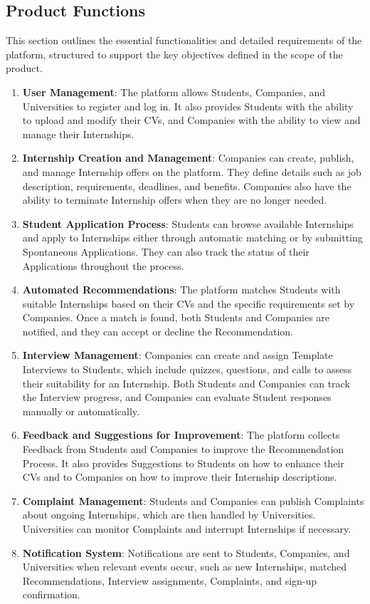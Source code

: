 \subsection{Product Functions}
This section outlines the essential functionalities and detailed requirements of the platform, structured to support the key objectives defined in the scope of the product.
\begin{enumerate}
    \item \textbf{User Management}: The platform allows Students, Companies, and Universities to register and log in. It also provides Students with the ability to upload and modify their CVs, and Companies with the ability to view and manage their Internships.
    \item \textbf{Internship Creation and Management}: Companies can create, publish, and manage Internship offers on the platform. They define details such as job description, requirements, deadlines, and benefits. Companies also have the ability to terminate Internship offers when they are no longer needed.
    \item \textbf{Student Application Process}: Students can browse available Internships and apply to Internships either through automatic matching or by submitting Spontaneous Applications. They can also track the status of their Applications throughout the process.
    \item \textbf{Automated Recommendations}: The platform matches Students with suitable Internships based on their CVs and the specific requirements set by Companies. Once a match is found, both Students and Companies are notified, and they can accept or decline the Recommendation.
    \item \textbf{Interview Management}: Companies can create and assign Template Interviews to Students, which include quizzes, questions, and calls to assess their suitability for an Internship. Both Students and Companies can track the Interview progress, and Companies can evaluate Student responses manually or automatically.
    \item \textbf{Feedback and Suggestions for Improvement}: The platform collects Feedback from Students and Companies to improve the Recommendation Process. It also provides Suggestions to Students on how to enhance their CVs and to Companies on how to improve their Internship descriptions.
    \item \textbf{Complaint Management}: Students and Companies can publish Complaints about ongoing Internships, which are then handled by Universities. Universities can monitor Complaints and interrupt Internships if necessary.
    \item \textbf{Notification System}: Notifications are sent to Students, Companies, and Universities when relevant events occur, such as new Internships, matched Recommendations, Interview assignments, Complaints, and sign-up confirmation.
\end{enumerate}

